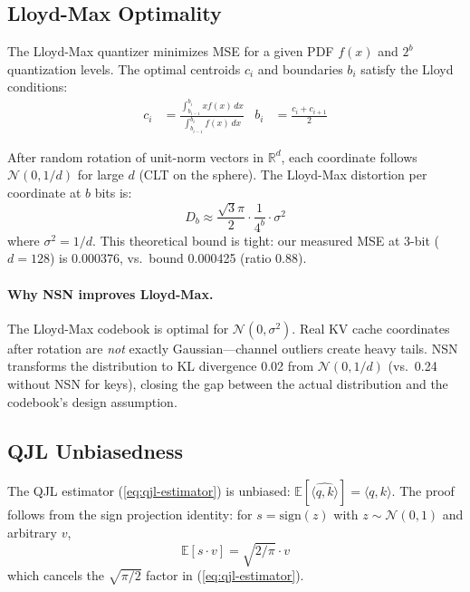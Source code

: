 \documentclass[sigconf,anonymous,review]{acmart}
\newcommand{\R}{\mathbb{R}}
\newcommand{\inner}[2]{\langle #1, #2 \rangle}
\begin{document}
\subsection{Lloyd-Max Optimality}

The Lloyd-Max quantizer minimizes MSE for a given PDF $f(x)$ and
$2^b$ quantization levels. The optimal centroids $c_i$ and boundaries
$b_i$ satisfy the Lloyd conditions:
\begin{align}
  c_i &= \frac{\int_{b_{i-1}}^{b_i} x f(x)\, dx}{\int_{b_{i-1}}^{b_i} f(x)\, dx}
  & b_i &= \frac{c_i + c_{i+1}}{2}
  \label{eq:lloyd-conditions}
\end{align}

After random rotation of unit-norm vectors in $\R^d$, each coordinate
follows $\mathcal{N}(0, 1/d)$ for large $d$ (CLT on the sphere).
The Lloyd-Max distortion per coordinate at $b$ bits is:
\begin{equation}
  D_b \approx \frac{\sqrt{3}\pi}{2} \cdot \frac{1}{4^b} \cdot \sigma^2
  \label{eq:lloyd-distortion}
\end{equation}
where $\sigma^2 = 1/d$. This theoretical bound is tight: our measured
MSE at 3-bit ($d=128$) is 0.000376, vs.\ bound 0.000425 (ratio 0.88).

\paragraph{Why NSN improves Lloyd-Max.}
The Lloyd-Max codebook is optimal for $\mathcal{N}(0, \sigma^2)$.
Real KV cache coordinates after rotation are \emph{not} exactly
Gaussian---channel outliers create heavy tails. NSN transforms the
distribution to KL divergence 0.02 from $\mathcal{N}(0, 1/d)$
(vs.\ 0.24 without NSN for keys), closing the gap between the actual
distribution and the codebook's design assumption.

\subsection{QJL Unbiasedness}

The QJL estimator (\ref{eq:qjl-estimator}) is unbiased:
$\mathbb{E}[\hat{\inner{q}{k}}] = \inner{q}{k}$.
The proof follows from the sign projection identity: for
$s = \mathrm{sign}(z)$ with $z \sim \mathcal{N}(0, 1)$ and
arbitrary $v$,
\begin{equation}
  \mathbb{E}[s \cdot v] = \sqrt{2/\pi} \cdot v
  \label{eq:sign-projection}
\end{equation}
which cancels the $\sqrt{\pi/2}$ factor in (\ref{eq:qjl-estimator}).
\end{document}
